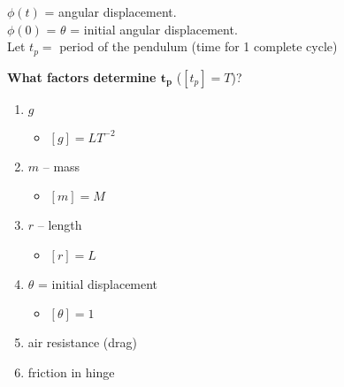 \documentclass[
	date={August 26{,} 2024}
]{math486notes}
\begin{document}
\begin{example}[Pendulum]
	$\phi(t)$ = angular displacement.\\
	$\phi(0)$ = $\theta$ = initial angular displacement.\\
	Let $t_{p} = $ period of the pendulum (time for 1 complete cycle)

	\textbf{What factors determine $\mathbf{t_{p}}$} ($[t_{p}] = T$)?
	\begin{enumerate}
		\item $g$
		\begin{itemize}
			\item $[g] = LT^{-2}$
		\end{itemize}
		\item $m$ -- mass
		\begin{itemize}
			\item $[m] = M$
		\end{itemize}
		\item $r$ -- length
		\begin{itemize}
			\item $[r] = L$
		\end{itemize}
		\item $\theta$ = initial displacement
		\begin{itemize}
			\item $[\theta] = 1$
		\end{itemize}
		\item air resistance (drag)
		\item friction in hinge
	\end{enumerate}


\end{example}
\end{document}

